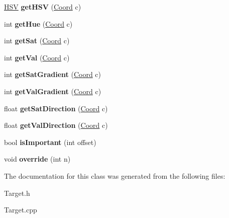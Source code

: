 \begin{DoxyCompactItemize}
\item 
\hypertarget{class_target_ab83ddbe10391f82878ea84c58d0ddba5}{\hyperlink{struct_h_s_v}{H\-S\-V} {\bfseries get\-H\-S\-V} (\hyperlink{struct_coord}{Coord} c)}\label{class_target_ab83ddbe10391f82878ea84c58d0ddba5}

\item 
\hypertarget{class_target_aa60099653b874ad3efd5ba0e71cf591d}{int {\bfseries get\-Hue} (\hyperlink{struct_coord}{Coord} c)}\label{class_target_aa60099653b874ad3efd5ba0e71cf591d}

\item 
\hypertarget{class_target_a926aa4ee64a304bb5bd531618f169177}{int {\bfseries get\-Sat} (\hyperlink{struct_coord}{Coord} c)}\label{class_target_a926aa4ee64a304bb5bd531618f169177}

\item 
\hypertarget{class_target_ac38c919ecd0a1965f97747fa289e2eef}{int {\bfseries get\-Val} (\hyperlink{struct_coord}{Coord} c)}\label{class_target_ac38c919ecd0a1965f97747fa289e2eef}

\item 
\hypertarget{class_target_a241d781ae2c23024f84fc11f0937e91f}{int {\bfseries get\-Sat\-Gradient} (\hyperlink{struct_coord}{Coord} c)}\label{class_target_a241d781ae2c23024f84fc11f0937e91f}

\item 
\hypertarget{class_target_aeb30c869530b4494f2e141a1a81df15e}{int {\bfseries get\-Val\-Gradient} (\hyperlink{struct_coord}{Coord} c)}\label{class_target_aeb30c869530b4494f2e141a1a81df15e}

\item 
\hypertarget{class_target_a5f8130358abc7aabbfe6c8434cefbf0b}{float {\bfseries get\-Sat\-Direction} (\hyperlink{struct_coord}{Coord} c)}\label{class_target_a5f8130358abc7aabbfe6c8434cefbf0b}

\item 
\hypertarget{class_target_aa9305d4a666a0817fb482a93a1acb5d5}{float {\bfseries get\-Val\-Direction} (\hyperlink{struct_coord}{Coord} c)}\label{class_target_aa9305d4a666a0817fb482a93a1acb5d5}

\item 
\hypertarget{class_target_a76cdb1404d38641f8822e08a0b35a9e6}{bool {\bfseries is\-Important} (int offset)}\label{class_target_a76cdb1404d38641f8822e08a0b35a9e6}

\item 
\hypertarget{class_target_ae6ff0c54b062b9f8de3027e22b84a987}{void {\bfseries override} (int n)}\label{class_target_ae6ff0c54b062b9f8de3027e22b84a987}

\end{DoxyCompactItemize}


The documentation for this class was generated from the following files\-:\begin{DoxyCompactItemize}
\item 
Target.\-h\item 
Target.\-cpp\end{DoxyCompactItemize}

